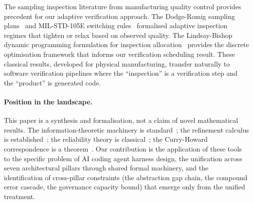 The sampling inspection literature from manufacturing quality control provides precedent for our adaptive verification approach. The Dodge-Romig sampling plans~\citep{dodge1929method, dodge1959sampling} and MIL-STD-105E switching rules~\citep{milstd105e} formalised adaptive inspection regimes that tighten or relax based on observed quality. The Lindsay-Bishop dynamic programming formulation for inspection allocation~\citep{lindsay1964allocation} provides the discrete optimisation framework that informs our verification scheduling result. These classical results, developed for physical manufacturing, transfer naturally to software verification pipelines where the ``inspection'' is a verification step and the ``product'' is generated code.

\paragraph{Position in the landscape.}
This paper is a synthesis and formalisation, not a claim of novel mathematical results. The information-theoretic machinery is standard~\citep{li2019introduction}; the refinement calculus is established~\citep{back1980correctness, morgan1994programming}; the reliability theory is classical~\citep{barlow1965mathematical}; the Curry-Howard correspondence is a theorem~\citep{wadler2015propositions}. Our contribution is the application of these tools to the specific problem of AI coding agent harness design, the unification across seven architectural pillars through shared formal machinery, and the identification of cross-pillar constraints (the abstraction gap chain, the compound error cascade, the governance capacity bound) that emerge only from the unified treatment.
